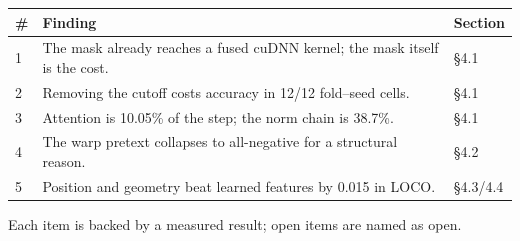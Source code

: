 \begin{frame}
  \centering
  \small
  \renewcommand{\arraystretch}{1.35}
  \begin{tabular}{@{}p{6mm}>{\raggedright\arraybackslash}p{103mm}p{17mm}@{}}
    \toprule
    \textbf{\#} & {\raggedright\textbf{Finding}} & \textbf{Section}\\
    \midrule
    1 & The mask already reaches a fused cuDNN kernel; the mask itself is the cost. & \S4.1\\
    2 & Removing the cutoff costs accuracy in 12/12 fold--seed cells. & \S4.1\\
    3 & Attention is 10.05\% of the step; the norm chain is 38.7\%. & \S4.1\\
    4 & The warp pretext collapses to all-negative for a structural reason. & \S4.2\\
    5 & Position and geometry beat learned features by 0.015 in LOCO. & \S4.3/4.4\\
    \bottomrule
  \end{tabular}
  \vspace{4mm}

  {\footnotesize Each item is backed by a measured result; open items are named as open.\par}
\end{frame}
